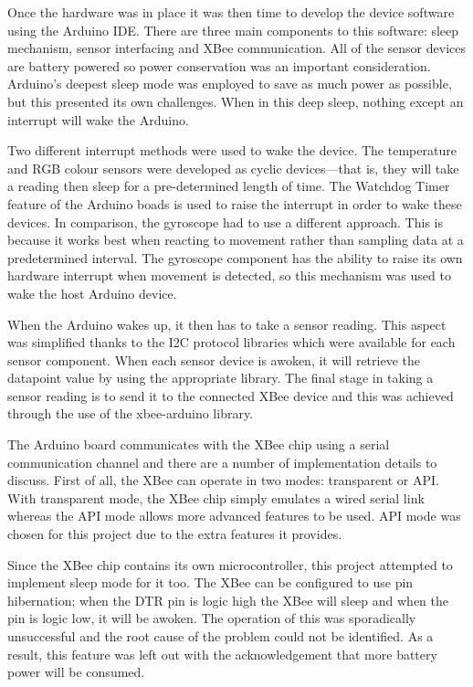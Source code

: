     Once the hardware was in place it was then time to develop the device software using the Arduino IDE. There are three main components to this software: sleep mechanism, sensor interfacing and XBee communication. All of the sensor devices are battery powered so power conservation was an important consideration. Arduino's deepest sleep mode was employed to save as much power as possible, but this presented its own challenges. When in this deep sleep, nothing except an interrupt will wake the Arduino.

    Two different interrupt methods were used to wake the device. The temperature and RGB colour sensors were developed as cyclic devices---that is, they will take a reading then sleep for a pre-determined length of time. The Watchdog Timer feature of the Arduino boads is used to raise the interrupt in order to wake these devices. In comparison, the gyroscope had to use a different approach. This is because it works best when reacting to movement rather than sampling data at a predetermined interval. The gyroscope component has the ability to raise its own hardware interrupt when movement is detected, so this mechanism was used to wake the host Arduino device.

    When the Arduino wakes up, it then has to take a sensor reading. This aspect was simplified thanks to the I2C protocol libraries which were available for each sensor component. When each sensor device is awoken, it will retrieve the datapoint value by using the appropriate library. The final stage in taking a sensor reading is to send it to the connected XBee device and this was achieved through the use of the xbee-arduino library.

    The Arduino board communicates with the XBee chip using a serial communication channel and there are a number of implementation details to discuss. First of all, the XBee can operate in two modes: transparent or API. With transparent mode, the XBee chip simply emulates a wired serial link whereas the API mode allows more advanced features to be used. API mode was chosen for this project due to the extra features it provides.

    Since the XBee chip contains its own microcontroller, this project attempted to implement sleep mode for it too. The XBee can be configured to use pin hibernation; when the DTR pin is logic high the XBee will sleep and when the pin is logic low, it will be awoken. The operation of this was sporadically unsuccessful and the root cause of the problem could not be identified. As a result, this feature was left out with the acknowledgement that more battery power will be consumed.

